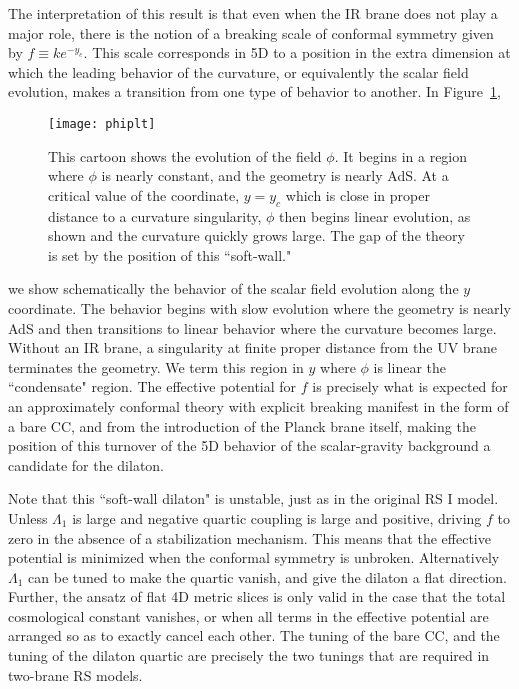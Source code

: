 \documentclass[12pt]{article}
\begin{document}
The interpretation of this result is that even when the IR brane does not play a major role, there is the notion of a breaking scale of conformal symmetry given by $f \equiv k e^{-y_c}$.  This scale corresponds in 5D to a position in the extra dimension at which the leading behavior of the curvature, or equivalently the scalar field evolution, makes a transition from one type of behavior to another.  In Figure~\ref{fig:phiplot}, 
\begin{figure}[!htbp]
	\center
\texttt{[image: phiplt]}
\label{fig:phiplt}
\caption{This cartoon shows the evolution of the field $\phi$.  It begins in a region where $\phi$ is nearly constant, and the geometry is nearly AdS.  At a critical value of the coordinate, $y = y_c$ which is close in proper distance to a curvature singularity, $\phi$ then begins linear evolution, as shown and the curvature quickly grows large.  The gap of the theory is set by the position of this ``soft-wall."}
\label{fig:phiplot}
\end{figure}
we show schematically the behavior of the scalar field evolution along the $y$ coordinate.  The behavior begins with slow evolution where the geometry is nearly AdS and then transitions to linear behavior where the curvature becomes large.   Without an IR brane, a singularity at finite proper distance from the UV brane terminates the geometry.  We term this region in $y$ where $\phi$ is linear the ``condensate" region.  The effective potential for $f$ is precisely what is expected for an approximately conformal theory with explicit breaking manifest in the form of a bare CC, and from the introduction of the Planck brane itself, making the position of this turnover of the 5D behavior of the scalar-gravity background a candidate for the dilaton.  

Note that this ``soft-wall dilaton" is unstable, just as in the original RS I model.  Unless $\Lambda_1$ is large and negative quartic coupling is large and positive, driving $f$ to zero in the absence of a stabilization mechanism.   This means that the effective potential is minimized when the conformal symmetry is unbroken.  Alternatively $\Lambda_1$ can be tuned to make the quartic vanish, and give the dilaton a flat direction.   Further, the ansatz of flat 4D metric slices is only valid in the case that the total cosmological constant vanishes, or when all terms in the effective potential are arranged so as to exactly cancel each other.  The tuning of the bare CC, and the tuning of the dilaton quartic are precisely the two tunings that are required in two-brane RS models. 
\end{document}
